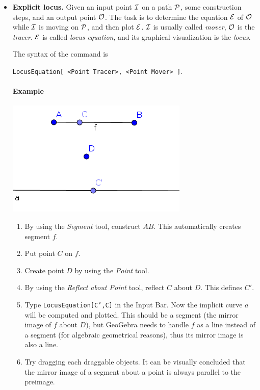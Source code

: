 \documentclass{article}
\begin{document}
\begin{itemize}
\item\textbf{Explicit locus.}
Given an input point $\cal{I}$ on a path $\cal{P}$, some construction steps, and an output point $\cal O$. The task is to determine the equation $\cal E$ of $\cal O$ while $\cal I$ is moving on $\cal P$, and then plot $\cal E$. $\cal I$ is usually called \textit{mover}, $\cal O$ is the \textit{tracer}. $\cal E$ is called \textit{locus equation}, and its graphical visualization is the \textit{locus}.

The syntax of the command is
\begin{center}
    \texttt{LocusEquation[ <Point Tracer>, <Point Mover> ]}.
\end{center}

\paragraph{Example}
\begin{center}
\includegraphics[scale=0.5]{LocusEquation-example-explicit}
\end{center}
\begin{enumerate}
    \item By using the \textit{Segment} tool, construct $AB$. This automatically creates segment $f$.
    \item Put point $C$ on $f$.
    \item Create point $D$ by using the \textit{Point} tool.
    \item By using the \textit{Reflect about Point} tool, reflect $C$ about $D$. This defines $C'$.
    \item Type \texttt{LocusEquation[C',C]} in the Input Bar. Now the implicit curve $a$ will be computed and plotted. This should be a segment (the mirror image of $f$ about $D$), but GeoGebra needs to handle $f$ as a line instead of a segment (for algebraic geometrical reasons), thus its mirror image is also a line.
    \item Try dragging each draggable objects. It can be visually concluded that the mirror image of a segment about a point is always parallel to the preimage.
\end{enumerate}


\end{itemize}
\end{document}
